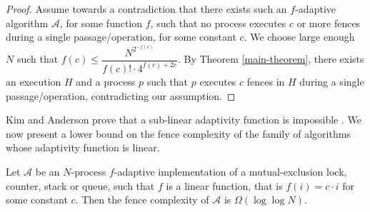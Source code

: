 \begin{proof}
	Assume towards a contradiction that there exists such an $f$-adaptive algorithm $\mathcal{A}$, for some function $f$, such that no process executes $c$ or more fences during a single passage/operation, for some constant $c$. We choose large enough $N$ such that $f(c) \leq \dfrac{N^{2^{-f(c)}}} {f(c)! \cdot 4^{f(c)+2c}}$. By Theorem \ref{main-theorem}, there exists an execution $H$ and a process $p$ such that $p$ executes $c$ fences in $H$ during a single passage/operation, contradicting our assumption.
\end{proof}

Kim and Anderson prove that a sub-linear adaptivity function is impossible \cite{DBLP:journals/dc/KimA12}.
We now present a lower bound on the fence complexity of the family of algorithms whose adaptivity function is linear.


\begin{corollary}
\label{corollary:linear}
Let $\mathcal{A}$ be an $N$-process $f$-adaptive implementation of a mutual-exclusion lock, counter, stack or queue, such that $f$ is a linear function, that is $f(i) = c \cdot i$ for some constant $c$. Then the fence complexity of $\mathcal{A}$ is $\Omega (\log \log N)$.
\end{corollary}

